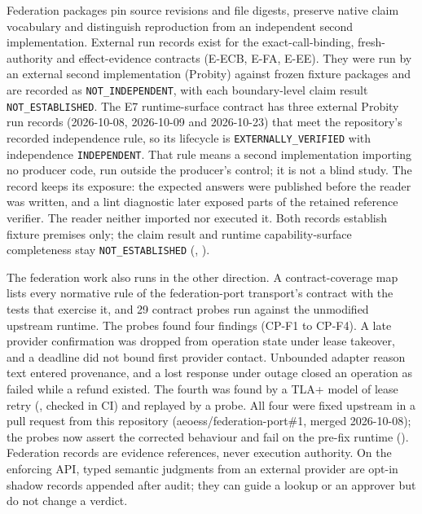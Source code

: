 \documentclass[10pt,twocolumn]{article}
\begin{document}
Federation packages pin source revisions and file digests, preserve native
claim vocabulary and distinguish reproduction from an independent second
implementation. External run records exist for the exact-call-binding,
fresh-authority and effect-evidence contracts (E-ECB, E-FA, E-EE). They were
run by an external second implementation (Probity) against frozen fixture
packages and are recorded as \texttt{NOT\_INDEPENDENT}, with each
boundary-level claim result \texttt{NOT\_ESTABLISHED}. The E7
runtime-surface contract has three external Probity run records (2026-10-08,
2026-10-09 and 2026-10-23) that meet the repository's recorded independence rule, so
its lifecycle is \texttt{EXTERNALLY\_VERIFIED} with independence
\texttt{INDEPENDENT}. That rule means a second implementation importing no
producer code, run outside the producer's control; it is not a blind study.
The record keeps its exposure: the expected answers were published before
the reader was written, and a lint diagnostic later exposed parts of the
retained reference verifier. The reader neither imported nor executed it. Both records establish fixture premises only; the claim result
and runtime capability-surface completeness stay \texttt{NOT\_ESTABLISHED}
(, ).

The federation work also runs in the other direction. A contract-coverage
map lists every normative rule of the federation-port transport's contract
with the tests that exercise it, and 29 contract probes run against the
unmodified upstream runtime. The probes found four findings (CP-F1 to
CP-F4). A late provider confirmation was dropped from operation state under
lease takeover, and a deadline did not bound first provider contact.
Unbounded adapter reason text entered provenance, and a lost response under
outage closed an operation as failed while a refund existed. The
fourth was found by a TLA+ model of lease retry
(, checked in CI) and replayed by a probe.
All four were fixed upstream in a pull request from this repository
(aeoess/federation-port\#1, merged 2026-10-08); the probes now assert the
corrected behaviour and fail on the pre-fix runtime
().
Federation records are evidence references, never execution authority. On
the enforcing API, typed semantic judgments from an external provider are
opt-in shadow records appended after audit; they can guide a lookup or an
approver but do not change a verdict.
\end{document}
